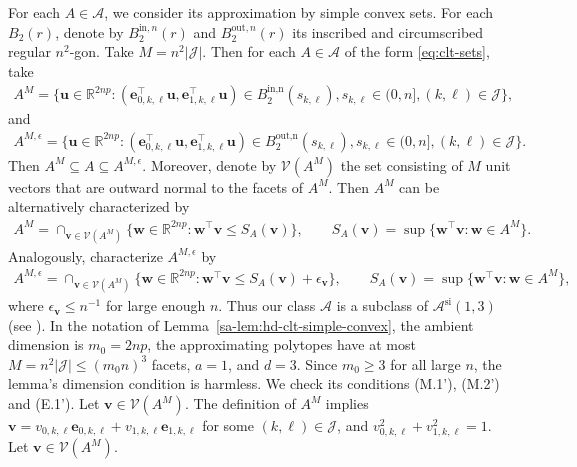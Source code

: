 \documentclass[10pt]{article}
\def\be{\mathbf{e}}
\def\bu{\mathbf{u}}
\def\bv{\mathbf{v}}
\def\reals{\mathbb{R}}
\theoremstyle{definition}
\theoremstyle{remark}
\begin{document}
For each $A \in \mathcal{A}$, we consider its approximation by simple convex sets. For each $B_2(r)$, denote by $B_2^{\text{in},n}(r)$ and $B_2^{\text{out},n}(r)$ its inscribed and circumscribed regular $n^2$-gon. Take $M = n^2 |\mathcal J|$. Then for each $A \in \mathcal{A}$ of the form \eqref{eq:clt-sets}, take
\begin{align*}
    A^M = \{\bu \in \reals^{2 n p}: (\be_{0,k,\ell}^\top \bu, \be_{1,k,\ell}^\top \bu) \in B_2^{\text{in,n}}(s_{k,\ell}), s_{k,\ell} \in (0,n], (k, \ell) \in \mathcal{J}\},
\end{align*}
and
\begin{align*}
    A^{M,\epsilon} = \{\bu \in \reals^{2 n p}: (\be_{0,k,\ell}^\top \bu, \be_{1,k,\ell}^\top \bu) \in B_2^{\text{out,n}}(s_{k,\ell}), s_{k,\ell} \in (0,n], (k, \ell) \in \mathcal{J}\}.
\end{align*}
Then $A^M \subseteq A \subseteq A^{M,\epsilon}$. Moreover, denote by  $\mathcal{V}(A^M)$ the set consisting of $M$ unit vectors that are outward normal to the facets of $A^M$. Then $A^M$ can be alternatively characterized by
\begin{align*}
    A^M = \cap_{\mathbf{v} \in \mathcal{V}(A^M)} \{\mathbf{w} \in \reals^{2 n p}: \mathbf{w}^\top \mathbf{v} \leq S_A(\mathbf{v})\}, \qquad S_A(\mathbf{v}) = \sup \{\mathbf{w}^\top \mathbf{v}: \mathbf{w} \in A^M\}.
\end{align*}
Analogously, characterize $A^{M,\epsilon}$ by
\begin{align*}
    A^{M,\epsilon} = \cap_{\mathbf{v} \in \mathcal{V}(A^M)} \{\mathbf{w} \in \reals^{2 n p}: \mathbf{w}^\top \mathbf{v} \leq S_A(\mathbf{v}) + \epsilon_{\mathbf{v}}\}, \qquad S_A(\mathbf{v}) = \sup \{\mathbf{w}^\top \mathbf{v}: \mathbf{w} \in A^M\},
\end{align*}
where $\epsilon_{\mathbf{v}} \leq n^{-1}$ for large enough $n$. Thus our class $\mathcal{A}$ is a subclass of $\mathcal{A}^\text{si}(1, 3)$ (see \cite[Section 3.1]{chernozhukov2017central}). In the notation of Lemma~\ref{sa-lem:hd-clt-simple-convex}, the ambient dimension is $m_0=2np$, the approximating polytopes have at most $M=n^2|\mathcal J|\leq(m_0 n)^3$ facets, $a=1$, and $d=3$. Since $m_0\geq3$ for all large $n$, the lemma's dimension condition is harmless. We check its conditions (M.1'), (M.2') and (E.1'). Let $\mathbf{v} \in \mathcal{V}(A^M)$. The definition of $A^M$ implies $\mathbf{v} = v_{0,k,\ell} \be_{0,k,\ell} + v_{1,k,\ell} \be_{1,k,\ell}$ for some $(k,\ell) \in \mathcal{J}$, and $v_{0,k,\ell}^2 + v_{1,k,\ell}^2 = 1$. Let $\bv \in \mathcal{V}(A^M)$.
\end{document}
